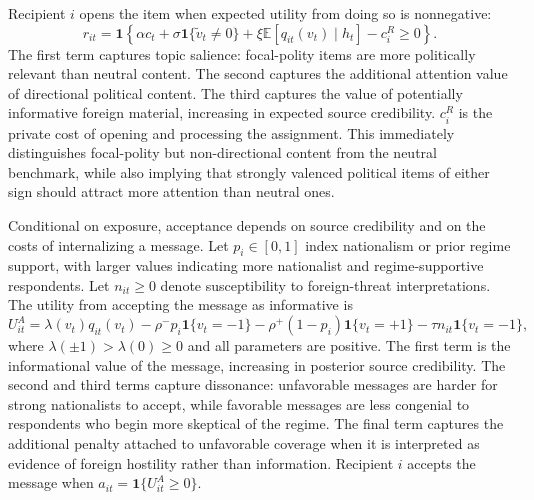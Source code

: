 \documentclass[12pt,american]{article}
\begin{document}
	Recipient \(i\) opens the item when expected utility from doing so is nonnegative:
	\[
	r_{it}=\mathbf{1}\left\{\alpha c_t+\sigma \mathbf{1}\{\tilde v_t\neq 0\}+\xi \mathbb{E}[q_{it}(v_t)\mid h_t]-c_i^R\ge 0\right\}.
	\]
		The first term captures topic salience: focal-polity items are more politically relevant than neutral content. The second captures the additional attention value of directional political content. The third captures the value of potentially informative foreign material, increasing in expected source credibility. \(c_i^R\) is the private cost of opening and processing the assignment. This immediately distinguishes focal-polity but non-directional content from the neutral benchmark, while also implying that strongly valenced political items of either sign should attract more attention than neutral ones.
	
	Conditional on exposure, acceptance depends on source credibility and on the costs of internalizing a message. Let \(p_i\in[0,1]\) index nationalism or prior regime support, with larger values indicating more nationalist and regime-supportive respondents. Let \(n_{it}\ge 0\) denote susceptibility to foreign-threat interpretations. The utility from accepting the message as informative is
	\[
	U_{it}^{A}=\lambda(v_t)q_{it}(v_t)-\rho^{-}p_i\mathbf{1}\{v_t=-1\}-\rho^{+}(1-p_i)\mathbf{1}\{v_t=+1\}-\tau n_{it}\mathbf{1}\{v_t=-1\},
	\]
		where \(\lambda(\pm 1)>\lambda(0)\ge 0\) and all parameters are positive. The first term is the informational value of the message, increasing in posterior source credibility. The second and third terms capture dissonance: unfavorable messages are harder for strong nationalists to accept, while favorable messages are less congenial to respondents who begin more skeptical of the regime. The final term captures the additional penalty attached to unfavorable coverage when it is interpreted as evidence of foreign hostility rather than information. Recipient \(i\) accepts the message when \(a_{it}=\mathbf{1}\{U_{it}^{A}\ge 0\}\).
	
\end{document}
